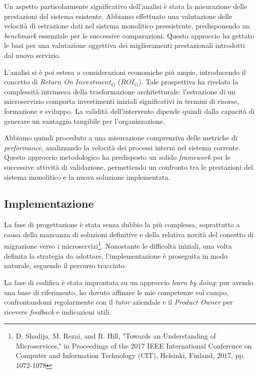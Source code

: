         \vspace{0.2 em}
        \noindent Un aspetto particolarmente significativo dell'analisi è stata la misurazione delle prestazioni del sistema esistente. Abbiamo effettuato una valutazione delle velocità di estrazione dati nel sistema monolitico preesistente, predisponendo un \textit{benchmark} essenziale per le successive comparazioni. Questo approccio ha gettato le basi per una valutazione oggettiva dei miglioramenti prestazionali introdotti dal nuovo servizio.

        \vspace{0.2 em}
        \noindent L'analisi si è poi estesa a considerazioni economiche più ampie, introducendo il concetto di \textit{Return On $Investment_G$} ($ROI_G$). Tale prospettiva ha rivelato la complessità intrinseca della trasformazione architetturale: l'estrazione di un microservizio comporta investimenti iniziali significativi in termini di risorse, formazione e sviluppo. La validità dell'intervento dipende quindi dalla capacità di generare un vantaggio tangibile per l'organizzazione.

        \vspace{0.2 em}
        \noindent Abbiamo quindi proceduto a una misurazione comprensiva delle metriche di \textit{performance}, analizzando la velocità dei processi interni nel sistema corrente. Questo approccio metodologico ha predisposto un solido \textit{framework} per le successive attività di validazione, permettendo un confronto tra le prestazioni del sistema monolitico e la nuova soluzione implementata.

        
        \subsection{Implementazione}
        La fase di progettazione è stata senza dubbio la più complessa, soprattutto a causa della mancanza di soluzioni definitive e della relativa novità del concetto di migrazione verso i microservizi\footnote{D. Shadija, M. Rezai, and R. Hill, "Towards an Understanding of Microservices," in Proceedings of the 2017 IEEE International Conference on Computer and Information Technology (CIT), Helsinki, Finland, 2017, pp. 1072-1078}. Nonostante le difficoltà iniziali, una volta definita la strategia da adottare, l'implementazione è proseguita in modo naturale, seguendo il percorso tracciato.  

        \vspace{0.2 em}
        \noindent La fase di codifica è stata improntata su un approccio \textit{learn by doing}: pur avendo una base di riferimento, ho dovuto affinare le mie competenze sul campo, confrontandomi regolarmente con il \textit{tutor} aziendale e il \textit{Product Owner} per ricevere \textit{feedback} e indicazioni utili.
        
